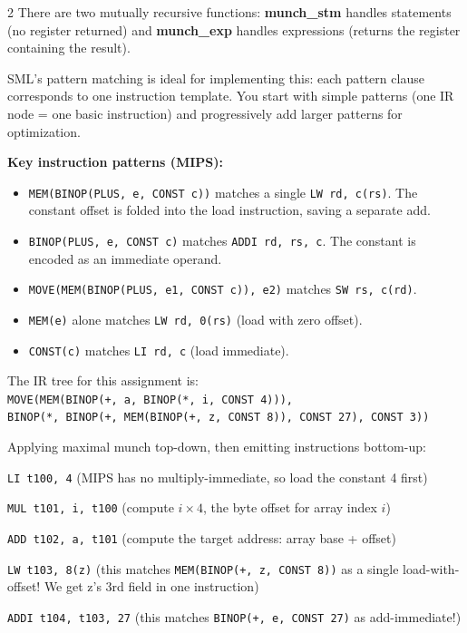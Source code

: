 \documentclass[9pt,landscape]{extarticle}
\begin{document}
\begin{multicols}{2}
There are two mutually recursive functions: \textbf{munch\_stm} handles statements (no register returned) and \textbf{munch\_exp} handles expressions (returns the register containing the result).

SML's pattern matching is ideal for implementing this: each pattern clause corresponds to one instruction template. You start with simple patterns (one IR node = one basic instruction) and progressively add larger patterns for optimization.

\textbf{Key instruction patterns (MIPS):}
\begin{itemize}
  \item \texttt{MEM(BINOP(PLUS, e, CONST c))} matches a single \texttt{LW rd, c(rs)}. The constant offset is folded into the load instruction, saving a separate add.
  \item \texttt{BINOP(PLUS, e, CONST c)} matches \texttt{ADDI rd, rs, c}. The constant is encoded as an immediate operand.
  \item \texttt{MOVE(MEM(BINOP(PLUS, e1, CONST c)), e2)} matches \texttt{SW rs, c(rd)}.
  \item \texttt{MEM(e)} alone matches \texttt{LW rd, 0(rs)} (load with zero offset).
  \item \texttt{CONST(c)} matches \texttt{LI rd, c} (load immediate).
\end{itemize}

\begin{exambox}[{Worked Example: Instruction Selection for a[i] = (z.field3 + 27) * 3}]
The IR tree for this assignment is:\\
\texttt{MOVE(MEM(BINOP(+, a, BINOP(*, i, CONST 4))),}\\
\quad\texttt{BINOP(*, BINOP(+, MEM(BINOP(+, z, CONST 8)), CONST 27), CONST 3))}

Applying maximal munch top-down, then emitting instructions bottom-up:

\texttt{LI t100, 4} \quad\quad (MIPS has no multiply-immediate, so load the constant 4 first)

\texttt{MUL t101, i, t100} \quad (compute $i \times 4$, the byte offset for array index $i$)

\texttt{ADD t102, a, t101} \quad (compute the target address: array base + offset)

\texttt{LW t103, 8(z)} \quad\quad (this matches \texttt{MEM(BINOP(+, z, CONST 8))} as a single load-with-offset! We get z's 3rd field in one instruction)

\texttt{ADDI t104, t103, 27} \quad (this matches \texttt{BINOP(+, e, CONST 27)} as add-immediate!)


\end{exambox}
\end{multicols}
\end{document}
